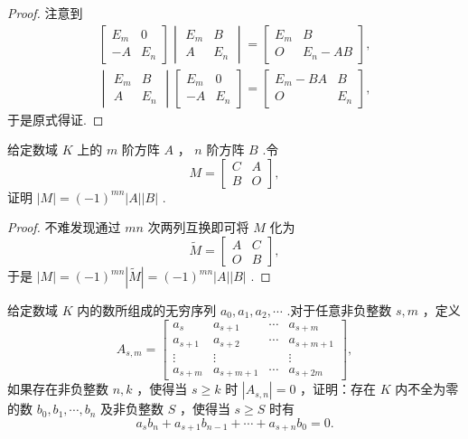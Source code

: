 \begin{proof}
	注意到
	\begin{gather*}
		\begin{bmatrix}
			E_m & 0   \\
			-A  & E_n
		\end{bmatrix}\begin{vmatrix}
			E_m & B   \\
			A   & E_n
		\end{vmatrix}=\begin{bmatrix}
			E_m & B      \\
			O   & E_n-AB
		\end{bmatrix},\\
		\begin{vmatrix}
			E_m & B   \\
			A   & E_n
		\end{vmatrix}\begin{bmatrix}
			E_m & 0   \\
			-A  & E_n
		\end{bmatrix}=\begin{bmatrix}
			E_m-BA & B   \\
			O      & E_n
		\end{bmatrix},
	\end{gather*}
	于是原式得证.
\end{proof}
\begin{prob}[14]
	给定数域 $K$ 上的 $m$ 阶方阵 $A$ ， $n$ 阶方阵 $B$ .令
	\[
		M=\begin{bmatrix}
			C & A \\
			B & O
		\end{bmatrix},
	\]
	证明 $|M|=(-1)^{mn}|A||B|$ .
\end{prob}
\begin{proof}
	不难发现通过 $mn$ 次两列互换即可将 $M$ 化为
	\[
		\widetilde{M}=\begin{bmatrix}
			A & C \\
			O & B
		\end{bmatrix},
	\]
	于是 $|M|=(-1)^{mn}|\widetilde{M}|=(-1)^{mn}|A||B|$ .
\end{proof}
\begin{prob}[15]
	给定数域 $K$ 内的数所组成的无穷序列 $a_0,a_1,a_2,\cdots$ .对于任意非负整数 $s,m$ ，定义
	\[
		A_{s,m}=\begin{bmatrix}
			a_s     & a_{s+1}   & \cdots & a_{s+m}   \\
			a_{s+1} & a_{s+2}   & \cdots & a_{s+m+1} \\
			\vdots  & \vdots    &        & \vdots    \\
			a_{s+m} & a_{s+m+1} & \cdots & a_{s+2m}
		\end{bmatrix},
	\]
	如果存在非负整数 $n,k$ ，使得当 $s\ge k$ 时 $|A_{s,n}|=0$ ，证明：存在 $K$ 内不全为零的数 $b_0,b_1,\cdots,b_n$ 及非负整数 $S$ ，使得当 $s\ge S$ 时有
	\[
		a_sb_n+a_{s+1}b_{n-1}+\cdots+a_{s+n}b_0=0.
	\]
\end{prob}
